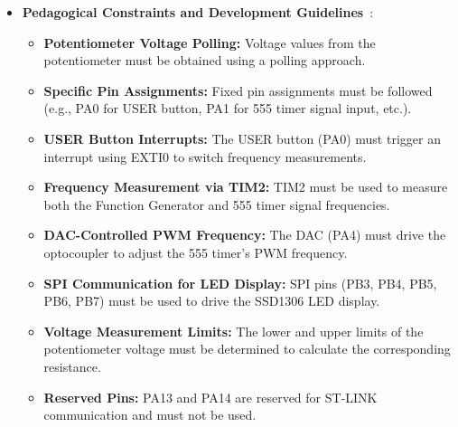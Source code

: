 \begin{itemize}[leftmargin=2em]
	\item \textbf{Pedagogical Constraints and Development Guidelines}~\cite{lab-manual}:
	\begin{itemize}
    	\item \textbf{Potentiometer Voltage Polling:} Voltage values from the potentiometer must be obtained using a polling approach.
    	\item \textbf{Specific Pin Assignments:} Fixed pin assignments must be followed (e.g., PA0 for USER button, PA1 for 555 timer signal input, etc.).
    	\item \textbf{USER Button Interrupts:} The USER button (PA0) must trigger an interrupt using EXTI0 to switch frequency measurements.
    	\item \textbf{Frequency Measurement via TIM2:} TIM2 must be used to measure both the Function Generator and 555 timer signal frequencies.
    	\item \textbf{DAC-Controlled PWM Frequency:} The DAC (PA4) must drive the optocoupler to adjust the 555 timer’s PWM frequency.
    	\item \textbf{SPI Communication for LED Display:} SPI pins (PB3, PB4, PB5, PB6, PB7) must be used to drive the SSD1306 LED display.
    	\item \textbf{Voltage Measurement Limits:} The lower and upper limits of the potentiometer voltage must be determined to calculate the corresponding resistance.
    	\item \textbf{Reserved Pins:} PA13 and PA14 are reserved for ST-LINK communication and must not be used.
	\end{itemize}
\end{itemize}
